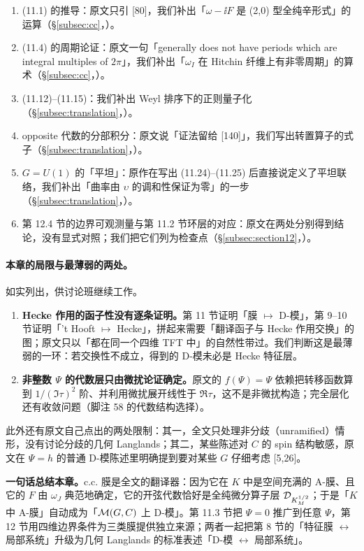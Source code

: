\begin{enumerate}
\item (11.1) 的推导：原文只引 [80]，我们补出「\(\omega-\ii F\) 是 (2,0) 型全纯辛形式」的运算（\S\ref{subsec:cc}，\pB）。
\item (11.4) 的周期论证：原文一句「generally does not have periods which are integral multiples of \(2\pi\)」，我们补出「\(\omega_I\) 在 Hitchin 纤维上有非零周期」的算术（\S\ref{subsec:cc}，\pB）。
\item (11.12)--(11.15)：我们补出 Weyl 排序下的正则量子化（\S\ref{subsec:translation}，\pB）。
\item opposite 代数的分部积分：原文说「证法留给 [140]」，我们写出转置算子的式子（\S\ref{subsec:translation}，\pB）。
\item \(G=U(1)\) 的「平坦」：原作在写出 (11.24)--(11.25) 后直接说定义了平坦联络，我们补出「曲率由 \(\upsilon\) 的调和性保证为零」的一步（\S\ref{subsec:translation}，\pB）。
\item 第 12.4 节的边界可观测量与第 11.2 节环层的对应：原文在两处分别得到结论，没有显式对照；我们把它们列为检查点（\S\ref{subsec:section12}，\pB）。
\end{enumerate}

\paragraph{本章的局限与最薄弱的两处。}如实列出，供讨论班继续工作。

\begin{enumerate}
\item \textbf{Hecke 作用的函子性没有逐条证明。}第 11 节证明「膜 \(\mapsto\) D-模」，第 9--10 节证明「't Hooft \(\mapsto\) Hecke」，拼起来需要「翻译函子与 Hecke 作用交换」的图；原文只以「都在同一个四维 TFT 中」的自然性带过。我们判断这是最薄弱的一环：若交换性不成立，得到的 D-模未必是 Hecke 特征层。\pC{}
\item \textbf{非整数 \(\Psi\) 的代数层只由微扰论证确定。}原文的 \(f(\Psi)=\Psi\) 依赖把转移函数算到 \(1/(\Im\tau)^2\) 阶、并利用微扰展开线性于 \(\Re\tau\)，这不是非微扰构造；完全层化还有收敛问题（脚注 58 的代数结构选择）。\pB{}\pA{}
\end{enumerate}

此外还有原文自己点出的两处限制：其一，全文只处理非分歧（unramified）情形，没有讨论分歧的几何 Langlands；其二，某些陈述对 \(C\) 的 spin 结构敏感，原文在 \(\Psi=h\) 的普通 D-模陈述里明确提到要对某些 \(G\) 仔细考虑 [5,26]。\pA{}

\begin{keyidea}
\textbf{一句话总结本章。}c.c. 膜是全文的翻译器：因为它在 \(K\) 中是空间充满的 A-膜、且它的 \(F\) 由 \(\omega_J\) 典范地确定，它的开弦代数恰好是全纯微分算子层 \(\mathcal{D}_{K_M^{1/2}}\)；于是「\(K\) 中 A-膜」自动成为「\(\mathcal{M}(G,C)\) 上 D-模」。第 11.3 节把 \(\Psi=0\) 推广到任意 \(\Psi\)，第 12 节用四维边界条件为三类膜提供独立来源；两者一起把第 8 节的「特征膜 \(\leftrightarrow\) 局部系统」升级为几何 Langlands 的标准表述「D-模 \(\leftrightarrow\) 局部系统」。
\end{keyidea}
